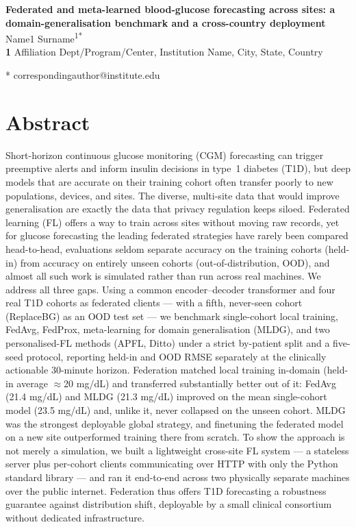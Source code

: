 \documentclass[10pt,letterpaper]{article}
\begin{document}
\vspace*{0.2in}

\begin{flushleft}
{\Large
\textbf{Federated and meta-learned blood-glucose forecasting across sites: a domain-generalisation benchmark and a cross-country deployment}
}
\newline
\\
Name1 Surname\textsuperscript{1*}
\\
\bigskip
\textbf{1} Affiliation Dept/Program/Center, Institution Name, City, State, Country
\\
\bigskip

* correspondingauthor@institute.edu

\end{flushleft}

\section*{Abstract}
Short-horizon continuous glucose monitoring (CGM) forecasting can trigger
preemptive alerts and inform insulin decisions in type~1 diabetes (T1D), but
deep models that are accurate on their training cohort often transfer poorly to
new populations, devices, and sites. The diverse, multi-site data that would
improve generalisation are exactly the data that privacy regulation keeps
siloed. Federated learning (FL) offers a way to train across sites without
moving raw records, yet for glucose forecasting the leading federated strategies
have rarely been compared head-to-head, evaluations seldom separate accuracy on
the training cohorts (held-in) from accuracy on entirely unseen cohorts
(out-of-distribution, OOD), and almost all such work is simulated rather than
run across real machines. We address all three gaps. Using a common
encoder--decoder transformer and four real T1D cohorts as federated clients ---
with a fifth, never-seen cohort (ReplaceBG) as an OOD test set --- we benchmark
single-cohort local training, FedAvg, FedProx, meta-learning for domain
generalisation (MLDG), and two personalised-FL methods (APFL, Ditto) under a
strict by-patient split and a five-seed protocol, reporting held-in and OOD RMSE
separately at the clinically actionable 30-minute horizon. Federation matched
local training in-domain (held-in average $\approx$20 mg/dL) and transferred
substantially better out of it: FedAvg (21.4 mg/dL) and MLDG (21.3 mg/dL)
improved on the mean single-cohort model (23.5 mg/dL) and, unlike it, never
collapsed on the unseen cohort. MLDG was the strongest deployable global
strategy, and finetuning the federated model on a new site outperformed training
there from scratch. To show the approach is not merely a simulation, we built a
lightweight cross-site FL system --- a stateless server plus per-cohort clients
communicating over HTTP with only the Python standard library --- and ran it
end-to-end across two physically separate machines over the public internet.
Federation thus offers T1D forecasting a robustness guarantee against
distribution shift, deployable by a small clinical consortium without dedicated
infrastructure.
\end{document}
